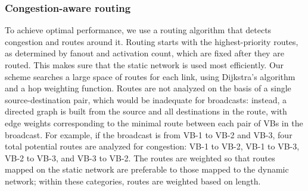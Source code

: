 
\subsubsection{Congestion-aware routing}
To achieve optimal performance, we use a routing algorithm that detects congestion and routes around it. 
Routing starts with the highest-priority routes, as determined by fanout and activation count, which are fixed after they are routed.
This makes sure that the static network is used most efficiently.
%
Our scheme searches a large space of routes for each link, using Dijkstra's algorithm \cite{dijkstra} and a hop weighting function.
Routes are not analyzed on the basis of a single source-destination pair, which would be inadequate for broadcasts: instead, a directed graph is built from the source and all destinations in the route, with edge weights corresponding to the minimal route between each pair of VBs in the broadcast.
For example, if the broadcast is from VB-1 to VB-2 and VB-3, four total potential routes are analyzed for congestion: VB-1 to VB-2, VB-1 to VB-3, VB-2 to VB-3, and VB-3 to VB-2.
The routes are weighted so that routes mapped on the static network are preferable to those mapped to the dynamic network; within these categories, routes are weighted based on length. 

